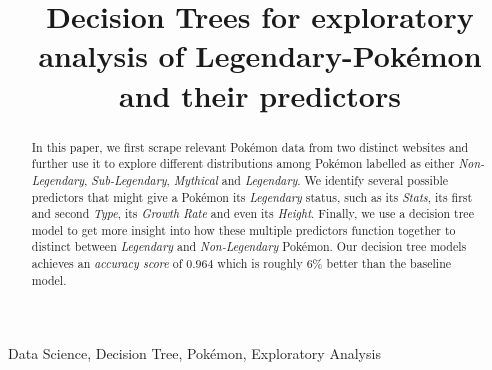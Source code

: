 \documentclass[conference]{IEEEtran}
\begin{document}
\title{Decision Trees for exploratory analysis of Legendary-Pokémon and their predictors}

\author{
\and
{}

}

\maketitle

\begin{abstract}
In this paper, we first scrape relevant Pokémon data from two distinct websites and further use it to explore different distributions among Pokémon labelled as either \textit{Non-Legendary}, \textit{Sub-Legendary}, \textit{Mythical} and \textit{Legendary}. We identify several possible predictors that might give a Pokémon its \textit{Legendary} status, such as its \textit{Stats}, its first and second \textit{Type}, its \textit{Growth Rate} and even its \textit{Height}. Finally, we use a decision tree model to get more insight into how these multiple predictors function together to distinct between \textit{Legendary} and \textit{Non-Legendary} Pokémon. Our decision tree models achieves an \textit{accuracy score} of $0.964$ which is roughly $6\%$ better than the baseline model.
\end{abstract}

\begin{IEEEkeywords}
Data Science, Decision Tree, Pokémon, Exploratory Analysis
\end{IEEEkeywords}
\end{document}
